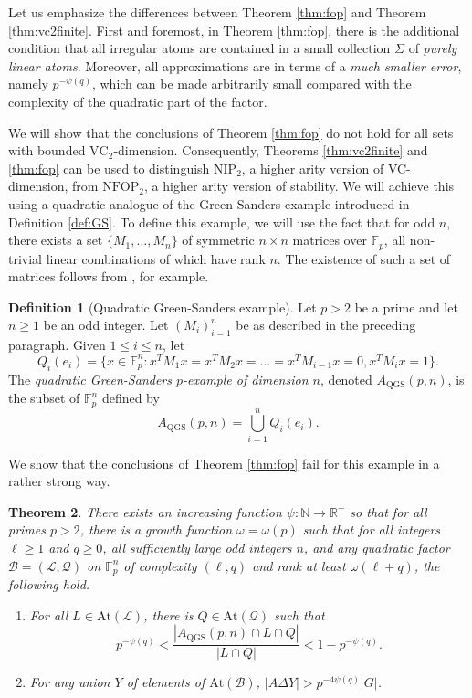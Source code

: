 \documentclass[12pt,oneside,british,a4wide]{amsart}
\newtheorem{theorem}{Theorem}[section]
\numberwithin{equation}{section}
\theoremstyle{definition}
\newtheorem{definition}[theorem]{Definition}
\def\F{\mathbb{F}}
\def\NFOP{\mathrm{NFOP}}
\def\NIP{\mathrm{NIP}}
\def\VC{\mathrm{VC}}
\def\QGS{\mathrm{QGS}}
\newcommand{\calL}{\mathcal{L}}
\newcommand{\calB}{\mathcal{B}}
\newcommand{\calQ}{\mathcal{Q}}
\newcommand{\At}{{\mathrm{At}}}
\begin{document}
Let us emphasize the differences between Theorem \ref{thm:fop} and Theorem \ref{thm:vc2finite}.  First and foremost,   in Theorem \ref{thm:fop}, there is the additional condition that all irregular atoms are contained in a small collection $\Sigma$ of \emph{purely linear atoms}. Moreover, all approximations are in terms of a \emph{much smaller error}, namely $p^{-\psi(q)}$, which can be made arbitrarily small compared with the complexity of the quadratic part of the factor. 




We will show that the conclusions of Theorem \ref{thm:fop} do not hold for all sets with bounded $\VC_2$-dimension.  Consequently, Theorems \ref{thm:vc2finite} and \ref{thm:fop} can be used to distinguish $\NIP_2$, a higher arity version of VC-dimension, from $\NFOP_2$, a higher arity version of stability.  We will achieve this using a quadratic analogue of the Green-Sanders example introduced in Definition \ref{def:GS}.  To define this example, we will use the fact that for odd $n$, there exists a set $\{M_1,\ldots, M_n\}$  of symmetric $n\times n$ matrices over $\F_p$, all non-trivial linear combinations of which have rank $n$. The existence of such a set of matrices follows from \cite[Lemma 3]{Dumas.2011}, for example.

\begin{definition}[Quadratic Green-Sanders example]\label{def:QGS}
 Let $p>2$ be a prime and let $n\geq 1$ be an odd integer. Let $(M_i)_{i=1}^n$ be as described in the preceding paragraph.  Given $1\leq i\leq n$, let
\[Q_i(e_i)=\{x\in \F_p^n:x^TM_1x=x^TM_2x=\dots = x^TM_{i-1}x=0, x^TM_ix=1\}.\]
The \emph{quadratic Green-Sanders $p$-example of dimension $n$}, denoted $A_{\QGS}(p,n)$, is the subset of $\mathbb{F}_p^n$ defined by
\[A_{\QGS}(p,n)=\bigcup_{i=1}^n Q_i(e_i).\]
\end{definition}

We show that the conclusions of Theorem \ref{thm:fop} fail for this example in a rather strong way.

\begin{theorem}\label{thm:ex1}
There exists an increasing function $\psi:\mathbb{N}\rightarrow \mathbb{R}^+$ so that for all primes $p>2$, there is a growth function $\omega=\omega(p)$ such that for all integers $\ell\geq 1$ and $q\geq 0$,  all sufficiently large odd integers $n$, and any quadratic factor $\calB=(\calL,\calQ)$ on $\F_p^n$ of complexity $(\ell,q)$ and rank at least $\omega(\ell+q)$, the following hold.
\begin{enumerate}[label=\normalfont(\roman*)] 
\item For all $L\in \At(\calL)$, there is $Q\in \At(\calQ)$ such that 
\[p^{-\psi(q)}< \frac{|A_{\QGS}(p,n)\cap L\cap Q|}{|L\cap Q|}< 1-p^{-\psi(q)}.\]
\item For any union $Y$ of elements of $\At(\calB)$, $|A\Delta Y|>p^{-4\psi(q)}|G|$. 
\end{enumerate}
\end{theorem}
\end{document}
